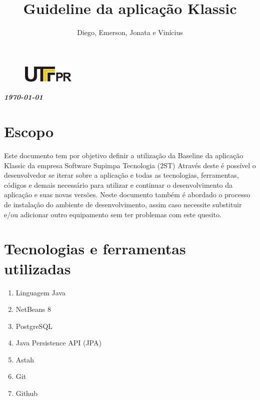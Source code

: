 \documentclass[	DIV=calc,%
							paper=a4,%
							fontsize=12pt,%
							onecolumn]{scrartcl}	 					%
\title{Guideline da aplicação Klassic}					%
\author{Diego, Emerson, Jonata e Vinícius }  	%
\date{}																				%
\newcommand{\initial}[1]{%
     \lettrine[lines=3,lhang=0.3,nindent=0em]{
     				\color{DarkGoldenrod}
     				{\textsf{#1}}}{}}
\begin{document}
\maketitle
\thispagestyle{fancy} 	
\thispagestyle{empty}		%





\begin{figure}
	\centering
	\includegraphics{utfpr}
\end{figure}

\vspace{3cm}
\centerline{\textit{\textbf{\today}}}
\clearpage

\section{Escopo}

Este documento tem por objetivo definir a utilização da Baseline da aplicação Klassic da 
empresa Software Supimpa Tecnologia (2ST)
Através deste é possível o desenvolvedor se iterar sobre a aplicação e todas as
tecnologias, ferramentas, códigos e demais necessário para utilizar e continuar o desenvolvimento da
aplicação e suas novas versões.
Neste documento também é abordado o processo de instalação do ambiente de
desenvolvimento, assim caso necessite substituir e/ou adicionar outro equipamento sem ter problemas
com este quesito. 


\section{Tecnologias e ferramentas utilizadas}
\begin{enumerate}
	\item Linguagem Java
	\item NetBeans 8
	\item PostgreSQL
	\item Java Persistence API (JPA)
	\item Astah
	\item Git
	\item Github
\end{enumerate}
\end{document}
